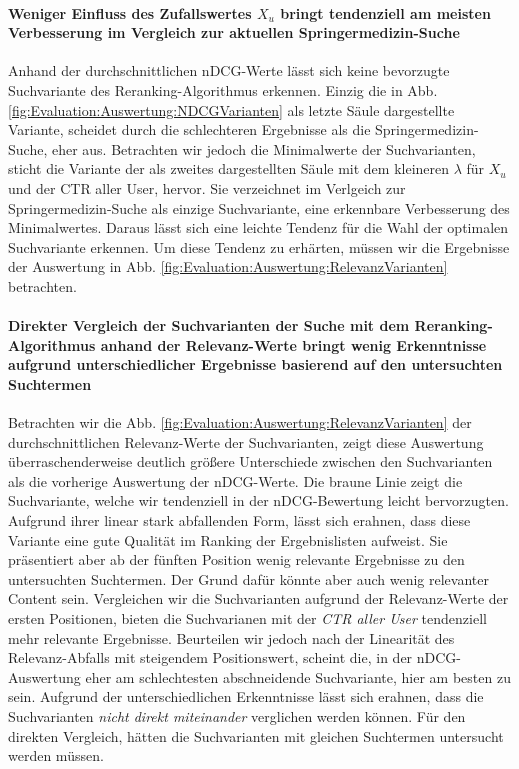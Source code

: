 \paragraph{Weniger Einfluss des Zufallswertes $X_u$ bringt tendenziell am meisten	 Verbesserung im Vergleich zur aktuellen Springermedizin-Suche} 
Anhand der durchschnittlichen nDCG-Werte lässt sich keine bevorzugte Suchvariante des Reranking-Algorithmus erkennen. Einzig die in Abb. \ref{fig:Evaluation:Auswertung:NDCGVarianten} als letzte Säule dargestellte Variante, scheidet durch die schlechteren Ergebnisse als die Springermedizin-Suche, eher aus. Betrachten wir jedoch die Minimalwerte der Suchvarianten, sticht die Variante der als zweites dargestellten Säule mit dem kleineren $\lambda$ für $X_u$ und der CTR aller User, hervor. Sie verzeichnet im Verlgeich zur Springermedizin-Suche als einzige Suchvariante, eine erkennbare Verbesserung des Minimalwertes. Daraus lässt sich eine leichte Tendenz für die Wahl der optimalen Suchvariante erkennen. Um diese Tendenz zu erhärten, müssen wir die Ergebnisse der Auswertung in Abb. \ref{fig:Evaluation:Auswertung:RelevanzVarianten} betrachten.

\paragraph{Direkter Vergleich der Suchvarianten der Suche mit dem Reranking-Algorithmus anhand der Relevanz-Werte bringt wenig Erkenntnisse aufgrund unterschiedlicher Ergebnisse basierend auf den untersuchten Suchtermen} 
Betrachten wir die Abb. \ref{fig:Evaluation:Auswertung:RelevanzVarianten} der durchschnittlichen Relevanz-Werte der Suchvarianten, zeigt diese Auswertung überraschenderweise deutlich größere Unterschiede zwischen den Suchvarianten als die vorherige Auswertung der nDCG-Werte. Die braune Linie zeigt die Suchvariante, welche wir tendenziell in der nDCG-Bewertung leicht bervorzugten. Aufgrund ihrer linear stark abfallenden Form, lässt sich erahnen, dass diese Variante eine gute Qualität im Ranking der Ergebnislisten aufweist. Sie präsentiert aber ab der fünften Position wenig relevante Ergebnisse zu den untersuchten Suchtermen. Der Grund dafür könnte aber auch wenig relevanter Content sein. Vergleichen wir die Suchvarianten aufgrund der Relevanz-Werte der ersten Positionen, bieten die Suchvarianen mit der \textit{CTR aller User} tendenziell mehr relevante Ergebnisse. Beurteilen wir jedoch nach der Linearität des Relevanz-Abfalls mit steigendem Positionswert, scheint die, in der nDCG-Auswertung eher am schlechtesten abschneidende Suchvariante, hier am besten zu sein. Aufgrund der unterschiedlichen Erkenntnisse lässt sich erahnen, dass die Suchvarianten \textit{nicht direkt miteinander} verglichen werden können. Für den direkten Vergleich, hätten die Suchvarianten mit gleichen Suchtermen untersucht werden müssen.

